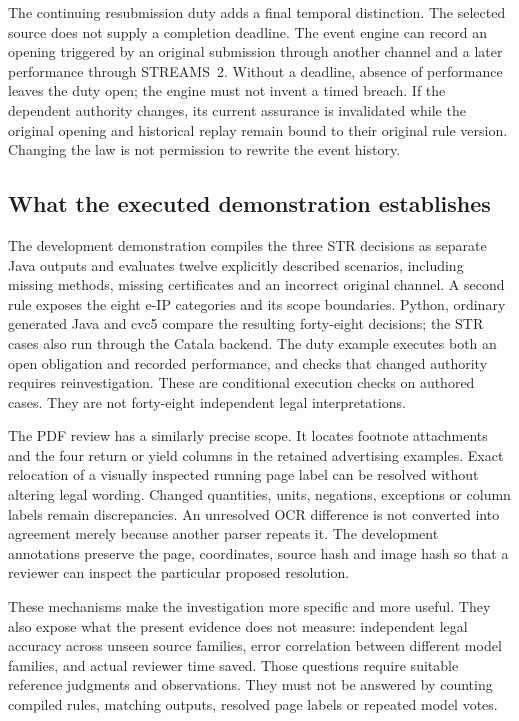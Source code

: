 The continuing resubmission duty adds a final temporal distinction. The selected
source does not supply a completion deadline. The event engine can record an
opening triggered by an original submission through another channel and a later
performance through STREAMS~2. Without a deadline, absence of performance leaves
the duty open; the engine must not invent a timed breach. If the dependent
authority changes, its current assurance is invalidated while the original
opening and historical replay remain bound to their original rule version.
Changing the law is not permission to rewrite the event history.

\subsection{What the executed demonstration establishes}

The development demonstration compiles the three STR decisions as separate
Java outputs and evaluates twelve explicitly described scenarios, including
missing methods, missing certificates and an incorrect original channel. A
second rule exposes the eight e-IP categories and its scope boundaries. Python,
ordinary generated Java and cvc5 compare the resulting forty-eight decisions;
the STR cases also run through the Catala backend. The duty example executes
both an open obligation and recorded performance, and checks that changed
authority requires reinvestigation. These are conditional execution checks on
authored cases. They are not forty-eight independent legal interpretations.

The PDF review has a similarly precise scope. It locates footnote attachments
and the four return or yield columns in the retained advertising examples.
Exact relocation of a visually inspected running page label can be resolved
without altering legal wording. Changed quantities, units, negations, exceptions
or column labels remain discrepancies. An unresolved OCR difference is not
converted into agreement merely because another parser repeats it. The
development annotations preserve the page, coordinates, source hash and image
hash so that a reviewer can inspect the particular proposed resolution.

These mechanisms make the investigation more specific and more useful. They
also expose what the present evidence does not measure: independent legal
accuracy across unseen source families, error correlation between different
model families, and actual reviewer time saved. Those questions require suitable
reference judgments and observations. They must not be answered by counting
compiled rules, matching outputs, resolved page labels or repeated model votes.

